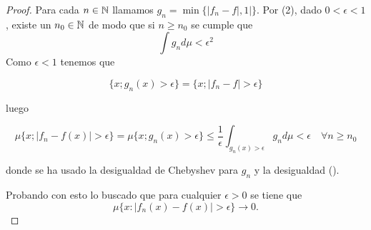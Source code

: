 \begin{proof}
    Para cada $n\in \mathbb{N}$ llamamos $g_n = \min\{|f_n - f|, 1|\}$.
    Por (2), dado $0 < \epsilon < 1$, existe un $n_0 \in \mathbb{N}$
    de modo que si $n \geq n_0$ se cumple que 
    \begin{equation}\label{eq:definiciones_Básicas_Integral_GN_menor_Epsilon_Cuadrado}
        \int g_n d\mu < \epsilon^2
    \end{equation}
    Como $\epsilon < 1$ tenemos que 

    \begin{equation}
        \{ x; g_n(x) > \epsilon \}
         = 
         \{ x; |f_n - f| > \epsilon \}
    \end{equation}

    luego 

    \begin{equation}
        \mu\{ x; |f_n - f(x)| > \epsilon \}
        = 
        \mu\{ x; g_n(x) > \epsilon \}
        \leq
        \frac{1}{\epsilon} 
        \int_{g_n(x) > \epsilon} g_n d\mu 
        < \epsilon 
        \quad
        \forall n \geq n_0
    \end{equation}

    donde se ha usado la desigualdad de Chebyshev para $g_n$ y la desigualdad 
    (). 

Probando con esto lo buscado que  para cualquier  $\epsilon > 0$ se tiene que 
$$\mu \{  x : |f_n(x) - f(x)| > \epsilon \} \longrightarrow 0.$$
\end{proof}


